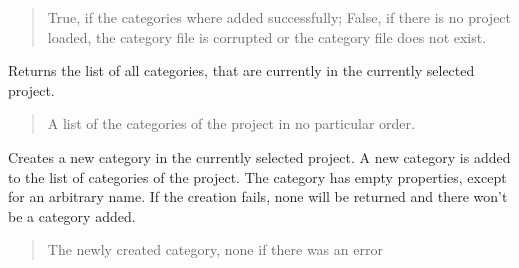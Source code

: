 \documentclass[letterpaper,10pt,english]{sphinxmanual}
\begin{document}
\begin{fulllineitems}
\begin{fulllineitems}
\begin{quote}
\begin{description}
\sphinxAtStartPar
True, if the categories where added successfully; False, if there is no project loaded, the category file is corrupted or the category file does not exist.

\sphinxAtStartPar
{}

\end{description}\end{quote}

\end{fulllineitems}


\begin{fulllineitems}
\label{\detokenize{apidoc/src.osm_configurator.control:src.osm_configurator.control.control.Control.get_list_of_categories}}
\pysigstartsignatures
{}
\pysigstopsignatures
\sphinxAtStartPar
Returns the list of all categories, that are currently in the currently selected project.
\begin{quote}\begin{description}
\sphinxAtStartPar
A list of the categories of the project in no particular order.

\sphinxAtStartPar
{}

\end{description}\end{quote}

\end{fulllineitems}


\begin{fulllineitems}
\label{\detokenize{apidoc/src.osm_configurator.control:src.osm_configurator.control.control.Control.create_category}}
\pysigstartsignatures
{}
\pysigstopsignatures
\sphinxAtStartPar
Creates a new category in the currently selected project.
A new category is added to the list of categories of the project. The category has empty properties, except for an arbitrary name.
If the creation fails, none will be returned and there won’t be a category added.
\begin{quote}\begin{description}
\sphinxAtStartPar
The newly created category, none if there was an error


\end{description}
\end{quote}
\end{fulllineitems}
\end{fulllineitems}
\end{document}
